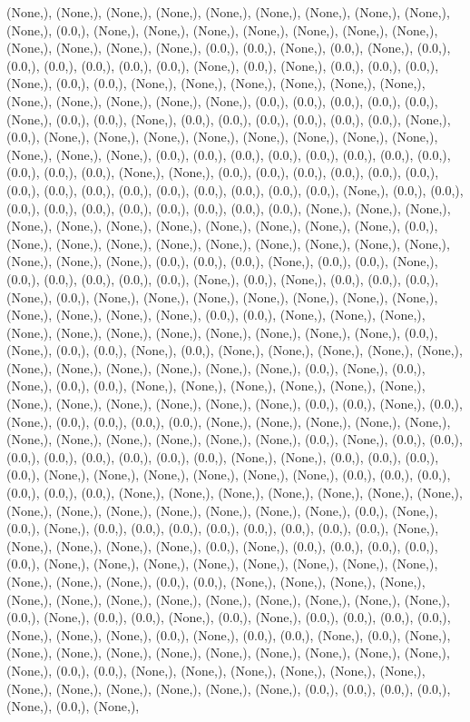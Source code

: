 \documentclass{article}
\begin{document}
(None,), (None,), (None,), (None,), (None,), (None,), (None,), (None,), (None,), (None,), (0.0,), (None,), (None,), (None,), (None,), (None,), (None,), (None,), (None,), (None,), (None,), (None,), (0.0,), (0.0,), (None,), (0.0,), (None,), (0.0,), (0.0,), (0.0,), (0.0,), (0.0,), (0.0,), (None,), (0.0,), (None,), (0.0,), (0.0,), (0.0,), (None,), (0.0,), (0.0,), (None,), (None,), (None,), (None,), (None,), (None,), (None,), (None,), (None,), (None,), (None,), (0.0,), (0.0,), (0.0,), (0.0,), (0.0,), (None,), (0.0,), (0.0,), (None,), (0.0,), (0.0,), (0.0,), (0.0,), (0.0,), (0.0,), (None,), (0.0,), (None,), (None,), (None,), (None,), (None,), (None,), (None,), (None,), (None,), (None,), (None,), (0.0,), (0.0,), (0.0,), (0.0,), (0.0,), (0.0,), (0.0,), (0.0,), (0.0,), (0.0,), (0.0,), (None,), (None,), (0.0,), (0.0,), (0.0,), (0.0,), (0.0,), (0.0,), (0.0,), (0.0,), (0.0,), (0.0,), (0.0,), (0.0,), (0.0,), (0.0,), (0.0,), (None,), (0.0,), (0.0,), (0.0,), (0.0,), (0.0,), (0.0,), (0.0,), (0.0,), (0.0,), (0.0,), (None,), (None,), (None,), (None,), (None,), (None,), (None,), (None,), (None,), (None,), (None,), (0.0,), (None,), (None,), (None,), (None,), (None,), (None,), (None,), (None,), (None,), (None,), (None,), (None,), (0.0,), (0.0,), (0.0,), (None,), (0.0,), (0.0,), (None,), (0.0,), (0.0,), (0.0,), (0.0,), (0.0,), (None,), (0.0,), (None,), (0.0,), (0.0,), (0.0,), (None,), (0.0,), (None,), (None,), (None,), (None,), (None,), (None,), (None,), (None,), (None,), (None,), (None,), (0.0,), (0.0,), (None,), (None,), (None,), (None,), (None,), (None,), (None,), (None,), (None,), (None,), (None,), (0.0,), (None,), (0.0,), (0.0,), (None,), (0.0,), (None,), (None,), (None,), (None,), (None,), (None,), (None,), (None,), (None,), (None,), (None,), (0.0,), (None,), (0.0,), (None,), (0.0,), (0.0,), (None,), (None,), (None,), (None,), (None,), (None,), (None,), (None,), (None,), (None,), (None,), (None,), (0.0,), (0.0,), (None,), (0.0,), (None,), (0.0,), (0.0,), (0.0,), (0.0,), (None,), (None,), (None,), (None,), (None,), (None,), (None,), (None,), (None,), (None,), (None,), (0.0,), (None,), (0.0,), (0.0,), (0.0,), (0.0,), (0.0,), (0.0,), (0.0,), (0.0,), (None,), (None,), (0.0,), (0.0,), (0.0,), (0.0,), (None,), (None,), (None,), (None,), (None,), (None,), (0.0,), (0.0,), (0.0,), (0.0,), (0.0,), (0.0,), (None,), (None,), (None,), (None,), (None,), (None,), (None,), (None,), (None,), (None,), (None,), (None,), (None,), (None,), (0.0,), (None,), (0.0,), (None,), (0.0,), (0.0,), (0.0,), (0.0,), (0.0,), (0.0,), (0.0,), (0.0,), (None,), (None,), (None,), (None,), (None,), (0.0,), (None,), (0.0,), (0.0,), (0.0,), (0.0,), (0.0,), (None,), (None,), (None,), (None,), (None,), (None,), (None,), (None,), (None,), (None,), (None,), (0.0,), (0.0,), (None,), (None,), (None,), (None,), (None,), (None,), (None,), (None,), (None,), (None,), (None,), (None,), (None,), (0.0,), (None,), (0.0,), (0.0,), (None,), (0.0,), (None,), (0.0,), (0.0,), (0.0,), (0.0,), (None,), (None,), (None,), (0.0,), (None,), (0.0,), (0.0,), (None,), (0.0,), (None,), (None,), (None,), (None,), (None,), (None,), (None,), (None,), (None,), (None,), (None,), (0.0,), (0.0,), (None,), (None,), (None,), (None,), (None,), (None,), (None,), (None,), (None,), (None,), (None,), (None,), (0.0,), (0.0,), (0.0,), (0.0,), (None,), (0.0,), (None,), 
\end{document}

